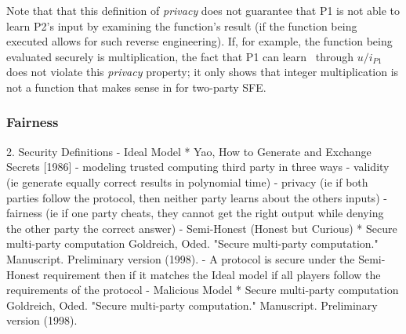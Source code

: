 Note that that this definition of \emph{privacy} does not guarantee that \ac{P1} is not able to learn \ac{P2}'s input by examining the function's result (if the function being executed allows for such reverse engineering).  If, for example, the function being evaluated securely is multiplication, the fact that \ac{P1} can learn \ptwoin\ through $u/i_{P1}$ does not violate this \emph{privacy} property; it only shows that integer multiplication is not a function that makes sense in for two-party \ac{SFE}.

\subsubsection{Fairness}


2. Security Definitions
    - Ideal Model
        * Yao, How to Generate and Exchange Secrets [1986]
        - modeling trusted computing third party in three ways
            - validity (ie generate equally correct results in polynomial time)
            - privacy (ie if both parties follow the protocol, then neither party learns about the others inputs)
            - fairness (ie if one party cheats, they cannot get the right output while denying the other party the correct answer)
    - Semi-Honest (Honest but Curious)
        * Secure multi-party computation
          Goldreich, Oded. "Secure multi-party computation." Manuscript. Preliminary version (1998).
        - A protocol is secure under the Semi-Honest requirement then if it matches the Ideal model if all players follow the requirements of the protocol
    - Malicious Model
        * Secure multi-party computation
          Goldreich, Oded. "Secure multi-party computation." Manuscript. Preliminary version (1998).
